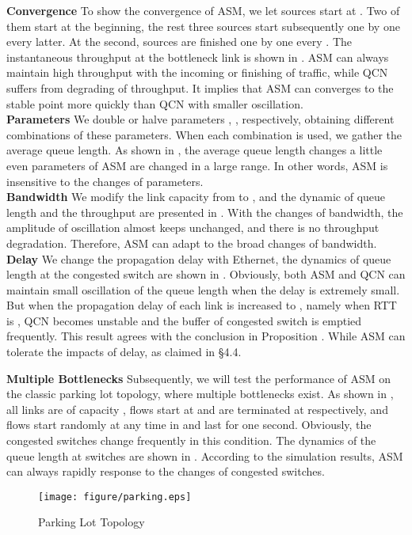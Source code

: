 \documentclass{sig-alternate-10pt}
\begin{document}
\textbf{Convergence}
To show the convergence of ASM, we let  sources start at . Two of them start at the beginning, the rest three sources start subsequently one by one every  latter. At the  second, sources are finished one by one every . The instantaneous throughput at the bottleneck link is shown in . ASM can always maintain high throughput with the incoming or finishing of traffic, while QCN suffers from degrading of throughput. It implies that ASM can converges to the stable point more quickly than QCN with smaller oscillation. \\
\textbf{Parameters} We double or halve parameters , ,  respectively, obtaining  different combinations of these parameters. When each combination is used, we gather the average queue length. As shown in , the average queue length changes a little even parameters of ASM are changed in a large range. In other words, ASM is insensitive to the changes of parameters. \\
\textbf{Bandwidth}
We modify the link capacity from  to , and the dynamic of queue length and the throughput are presented in . With the changes of bandwidth, the amplitude of oscillation almost keeps unchanged, and there is no throughput degradation. Therefore, ASM can adapt to the broad changes of bandwidth.
\\
\textbf{Delay}
We change the propagation delay with  Ethernet, the dynamics of queue length at the congested switch are shown in . Obviously, both ASM and QCN can maintain small oscillation of the queue length when the delay is extremely small. But when the propagation delay of each link is increased to , namely when RTT is , QCN becomes unstable and the buffer of congested switch is emptied frequently. This result agrees with the conclusion in Proposition . While ASM can tolerate the impacts of delay, as claimed in \S4.4.

\noindent\textbf{Multiple Bottlenecks}
Subsequently, we will test the performance of ASM on the classic parking lot topology, where multiple bottlenecks exist. As shown in , all links are of capacity , flows  start at  and are terminated at  respectively, and flows  start randomly at any time in  and last for one second. Obviously, the congested switches change frequently in this condition. The dynamics of the queue length at switches are shown in . According to the simulation results, ASM can always rapidly response to the changes of congested switches.

\begin{figure}
\centering
\texttt{[image: figure/parking.eps]}
\caption{Parking Lot Topology}
\label{park-lot}
\end{figure}
\end{document}

